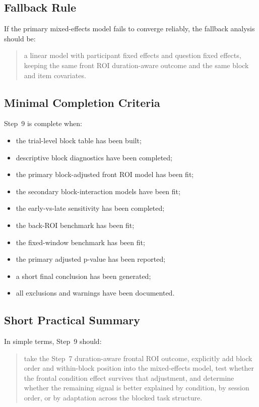 \subsection{Fallback Rule}
If the primary mixed-effects model fails to converge reliably, the fallback analysis should be:
\begin{quote}
a linear model with participant fixed effects and question fixed effects, keeping the same
front ROI duration-aware outcome and the same block and item covariates.
\end{quote}

\subsection{Minimal Completion Criteria}
Step~9 is complete when:
\begin{itemize}
    \item the trial-level block table has been built;
    \item descriptive block diagnostics have been completed;
    \item the primary block-adjusted front ROI model has been fit;
    \item the secondary block-interaction models have been fit;
    \item the early-vs-late sensitivity has been completed;
    \item the back-ROI benchmark has been fit;
    \item the fixed-window benchmark has been fit;
    \item the primary adjusted p-value has been reported;
    \item a short final conclusion has been generated;
    \item all exclusions and warnings have been documented.
\end{itemize}

\subsection{Short Practical Summary}
In simple terms, Step~9 should:
\begin{quote}
take the Step~7 duration-aware frontal ROI outcome, explicitly add block order and within-block
position into the mixed-effects model, test whether the frontal condition effect survives that adjustment,
and determine whether the remaining signal is better explained by condition, by session order,
or by adaptation across the blocked task structure.
\end{quote}
